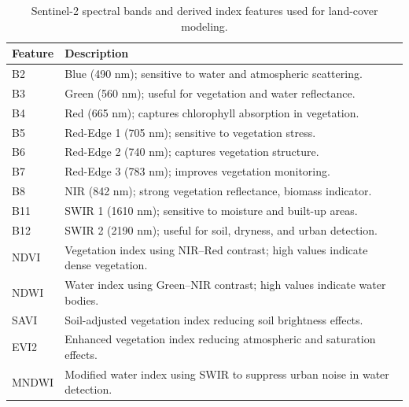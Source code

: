 \documentclass[11pt]{article}
\begin{document}
\begin{table}[t]
\centering
\small
\setlength{\tabcolsep}{6pt}
\renewcommand{\arraystretch}{1.15}
\begin{tabular}{ll}
\hline
\textbf{Feature} & \textbf{Description} \\
\hline

B2  & Blue (490 nm); sensitive to water and atmospheric scattering. \\
B3  & Green (560 nm); useful for vegetation and water reflectance. \\
B4  & Red (665 nm); captures chlorophyll absorption in vegetation. \\
B5  & Red-Edge 1 (705 nm); sensitive to vegetation stress. \\
B6  & Red-Edge 2 (740 nm); captures vegetation structure. \\
B7  & Red-Edge 3 (783 nm); improves vegetation monitoring. \\
B8  & NIR (842 nm); strong vegetation reflectance, biomass indicator. \\
B11 & SWIR 1 (1610 nm); sensitive to moisture and built-up areas. \\
B12 & SWIR 2 (2190 nm); useful for soil, dryness, and urban detection. \\

NDVI \citep{yangshao2016}  & Vegetation index using NIR–Red contrast; high values indicate dense vegetation. \\
NDWI \citep{mcfeeters1996ndwi}  & Water index using Green–NIR contrast; high values indicate water bodies. \\
SAVI \citep{huete1988savi}  & Soil-adjusted vegetation index reducing soil brightness effects. \\
EVI2 \citep{jiang2008evi2}  & Enhanced vegetation index reducing atmospheric and saturation effects. \\
MNDWI \citep{xu2008mndbi} & Modified water index using SWIR to suppress urban noise in water detection. \\

\hline
\end{tabular}
\caption{Sentinel-2 spectral bands and derived index features used for land-cover modeling.}
\label{tab:feature_engineering}
\end{table}
\end{document}

